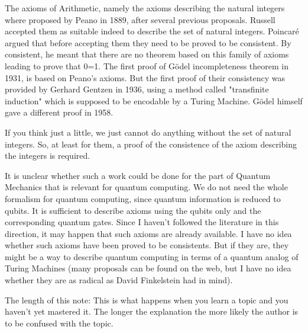 The axioms of Arithmetic, namely the axioms describing the natural
integers where proposed by Peano in 1889, after several previous
proposals. Russell accepted them as suitable indeed to describe the set
of natural integers. Poincar\'e argued that before accepting them they need
to be proved to be consistent. By consistent, he meant that there are no
theorem based on this family of axioms leading to prove that 0=1. The
first proof of G\"odel incompleteness theorem in 1931, is based on Peano's
axioms. But the first proof of their consistency was provided by Gerhard
Gentzen in 1936, using a method called "transfinite induction" which is
supposed to be encodable by a Turing Machine. G\"odel himself gave a
different proof in 1958.

If you think just a little, we just cannot do anything without the set of
natural integers. So, at least for them, a proof of the consistence of
the axiom describing the integers is required.

It is unclear whether such a work could be done for the part of Quantum
Mechanics that is relevant for quantum computing. We do not need the
whole formalism for quantum computing, since quantum information is
reduced to qubits. It is sufficient to describe axioms using the qubits
only and the corresponding quantum gates. Since I haven't followed the
literature in this direction, it may happen that such axioms are already
available. I have no idea whether such axioms have been proved to be
consistents. But if they are, they might be a way to describe quantum
computing in terms of a quantum analog of Turing Machines (many proposals
can be found on the web, but I have no idea whether they are as radical
as David Finkelstein had in mind).

The length of this note: This is what happens when you learn a topic and
you haven't yet mastered it. The longer the explanation the more likely
the author is to be confused with the topic.
